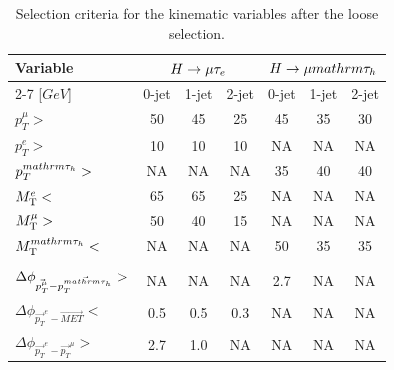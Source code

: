 \documentclass[oneside, letterpaper, oldfontcommands]{memoir}
\begin{document}
{{{\begin{table}[hbtp]
 \centering
 \caption{Selection criteria for the kinematic variables after the loose selection.}
  \label{tab:kinematicselection}
   \begin{tabular}{lccc|ccc} \hline
Variable &\multicolumn{3}{c|}{$H\rightarrow\mu\mathrm{\tau}_{e}$ }                 &     \multicolumn{3}{c}{$H \rightarrow \mu mathrm{\tau_{h}}$}
 \\ \cline{2-7}
      [$GeV$]                                   &  0-jet        & 1-jet       & 2-jet         &  0-jet         & 1-jet       & 2-jet  \\ \hline
$p_{T}^{\mu}>$                                &     50        &   45        &   25          &  45            & 35          &  30    \\
$p_{T}^{e}>$                                  &     10        &   10        &   10          &   NA            &  NA          &  NA      \\
$p_{T}^{mathrm{\tau_{h}}}>$                               &     NA         &    NA        &    NA          &  35            & 40          &  40    \\
$M_\mathrm{T}^{e}<$                                   &    65         &   65        &   25          &    NA           &   NA         &  NA      \\
$M_\mathrm{T}^{\mu}>$                                 &    50         &   40        &   15          &    NA           &   NA         &  NA      \\
$M_\mathrm{T}^{mathrm{\tau_{h}}}<$                                &     NA         &    NA        &    NA          &  50            & 35          &   35   \\   \hline
      [radians]                               &                     &                \\  \hline
$\Delta \phi_{\vec{p_{T}^{\mu}}-\vec{p_{T}^{mathrm{\tau_{h}}}}}>$   &     NA         &    NA        &    NA          &  2.7           &  NA          &  NA      \\
$\Delta \phi_{\vec{p_{T}}^{e}-\vec{MET}}<$             &    0.5        &   0.5       &   0.3         &    NA           &  NA          &  NA      \\
$\Delta \phi_{\vec{p_{T}}^{e}-\vec{p_{T}}^{\mu}}>$            &    2.7        &   1.0       &    NA          &    NA           &   NA         &  NA      \\  \hline

  \end{tabular}
\end{table}

}}}
\end{document}
